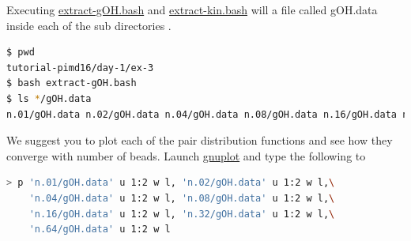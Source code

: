 \documentclass{article}
\begin{document}
\begin{Exercise}[label={water},title={Benchmark of quantum effects in a water molecule}]
\Question
Executing \url{extract-gOH.bash} and \url{extract-kin.bash} will a file called gOH.data inside each of the sub directories .
\begin{lstlisting}[language=bash]
$ pwd
tutorial-pimd16/day-1/ex-3
$ bash extract-gOH.bash
$ ls */gOH.data  
n.01/gOH.data n.02/gOH.data n.04/gOH.data n.08/gOH.data n.16/gOH.data n.32/gOH.data n.64/gOH.data
\end{lstlisting}
We suggest you to plot each of the pair distribution functions and see how they converge with number of beads. Launch \url{gnuplot} and type the following to

\begin{lstlisting}[language=bash]
> p 'n.01/gOH.data' u 1:2 w l, 'n.02/gOH.data' u 1:2 w l,\
    'n.04/gOH.data' u 1:2 w l, 'n.08/gOH.data' u 1:2 w l,\
    'n.16/gOH.data' u 1:2 w l, 'n.32/gOH.data' u 1:2 w l,\
    'n.64/gOH.data' u 1:2 w l
\end{lstlisting}

\end{Exercise}
\end{document}
